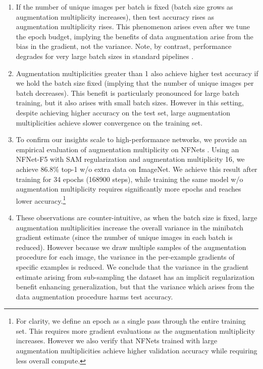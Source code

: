 \documentclass{article}
\begin{document}
\begin{enumerate}
    \item If the number of unique images per batch is fixed (batch size grows as augmentation multiplicity increases), then test accuracy rises as augmentation multiplicity rises. This phenomenon arises even after we tune the epoch budget, implying the benefits of data augmentation arise from the bias in the gradient, not the variance. Note, by contrast, performance degrades for very large batch sizes in standard pipelines \citep{smith2020generalization}.
    
    \item Augmentation multiplicities greater than 1 also achieve higher test accuracy if we hold the batch size fixed (implying that the number of unique images per batch decreases). This benefit is particularly pronounced for large batch training, but it also arises with small batch sizes. However in this setting, despite achieving higher accuracy on the test set, large augmentation multiplicities achieve slower convergence on the training set. 

    \item To confirm our insights scale to high-performance networks, we provide an empirical evaluation of augmentation multiplicity on NFNets \citep{brock2021high}. Using an NFNet-F5 with SAM regularization and augmentation multiplicity 16, we achieve 86.8$\%$ top-1 w/o extra data on ImageNet. We achieve this result after training for 34 epochs (168900 steps), while training the same model w/o augmentation multiplicity requires significantly more epochs and reaches lower accuracy.\footnote{For clarity, we define an epoch as a single pass through the entire training set. This requires more gradient evaluations as the augmentation multiplicity increases. However we also verify that NFNets trained with large augmentation multiplicities achieve higher validation accuracy while requiring less overall compute.} 
    
    \item These observations are counter-intuitive, as when the batch size is fixed, large augmentation multiplicities increase the overall variance in the minibatch gradient estimate (since the number of unique images in each batch is reduced). However because we draw multiple samples of the augmentation procedure for each image, the variance in the per-example gradients of specific examples is reduced. We conclude that the variance in the gradient estimate arising from sub-sampling the dataset has an implicit regularization benefit enhancing generalization, but that the variance which arises from the data augmentation procedure harms test accuracy.
    

\end{enumerate}
\end{document}
